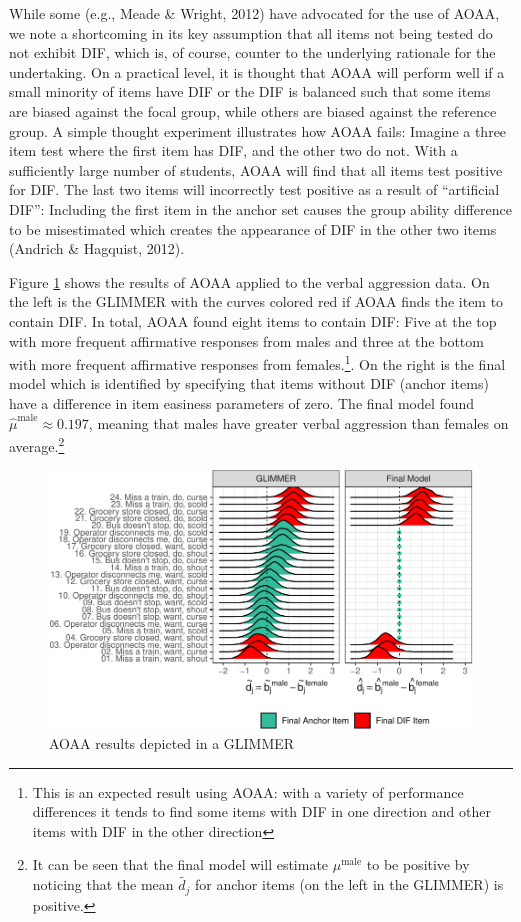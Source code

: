 \documentclass[
  english,
  man,floatsintext]{apa6}
\begin{document}
While some (e.g., Meade \& Wright, 2012) have advocated for the use of AOAA, we note a shortcoming in its key assumption that all items not being tested do not exhibit DIF, which is, of course, counter to the underlying rationale for the undertaking. On a practical level, it is thought that AOAA will perform well if a small minority of items have DIF or the DIF is balanced such that some items are biased against the focal group, while others are biased against the reference group. A simple thought experiment illustrates how AOAA fails: Imagine a three item test where the first item has DIF, and the other two do not. With a sufficiently large number of students, AOAA will find that all items test positive for DIF. The last two items will incorrectly test positive as a result of ``artificial DIF'': Including the first item in the anchor set causes the group ability difference to be misestimated which creates the appearance of DIF in the other two items (Andrich \& Hagquist, 2012).

Figure \ref{fig:aoaa} shows the results of AOAA applied to the verbal aggression data. On the left is the GLIMMER with the curves colored red if AOAA finds the item to contain DIF. In total, AOAA found eight items to contain DIF: Five at the top with more frequent affirmative responses from males and three at the bottom with more frequent affirmative responses from females.\footnote{This is an expected result using AOAA: with a variety of performance differences it tends to find some items with DIF in one direction and other items with DIF in the other direction}. On the right is the final model which is identified by specifying that items without DIF (anchor items) have a difference in item easiness parameters of zero. The final model found \(\hat \mu^\text{male} \approx 0.197\), meaning that males have greater verbal aggression than females on average.\footnote{It can be seen that the final model will estimate \(\mu^\text{male}\) to be positive by noticing that the mean \(\tilde {d_j}\) for anchor items (on the left in the GLIMMER) is positive.}

\begin{figure}[h]

{\centering \includegraphics{paper_apa_files/figure-latex/aoaa-1} 

}

\caption{AOAA results depicted in a GLIMMER}\label{fig:aoaa}
\end{figure}
\end{document}
